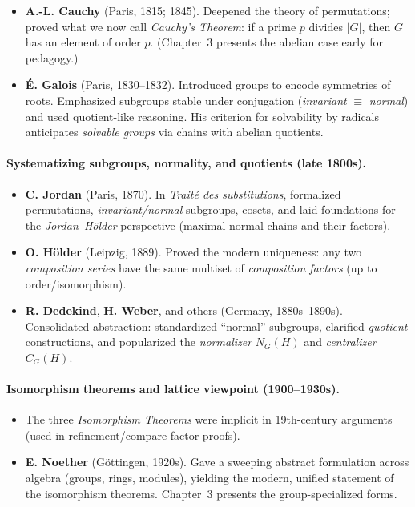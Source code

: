 \documentclass[9pt]{article}
\theoremstyle{definition}
\begin{document}
\begin{itemize}
  \item \textbf{A.-L. Cauchy} (Paris, 1815; 1845). Deepened the theory of permutations; proved what we now call \emph{Cauchy’s Theorem}: if a prime $p$ divides $|G|$, then $G$ has an element of order $p$. (Chapter~3 presents the abelian case early for pedagogy.)
  \item \textbf{É. Galois} (Paris, 1830–1832). Introduced groups to encode symmetries of roots. Emphasized subgroups stable under conjugation (\emph{invariant} $\equiv$ \emph{normal}) and used quotient-like reasoning. His criterion for solvability by radicals anticipates \emph{solvable groups} via chains with abelian quotients.
\end{itemize}

\newpage

\paragraph{Systematizing subgroups, normality, and quotients (late 1800s).}

\newpage

\begin{itemize}
  \item \textbf{C. Jordan} (Paris, 1870). In \emph{Traité des substitutions}, formalized permutations, \emph{invariant/normal} subgroups, cosets, and laid foundations for the \emph{Jordan–Hölder} perspective (maximal normal chains and their factors).
  \item \textbf{O. Hölder} (Leipzig, 1889). Proved the modern uniqueness: any two \emph{composition series} have the same multiset of \emph{composition factors} (up to order/isomorphism).
  \item \textbf{R. Dedekind}, \textbf{H. Weber}, and others (Germany, 1880s–1890s). Consolidated abstraction: standardized “normal” subgroups, clarified \emph{quotient} constructions, and popularized the \emph{normalizer} $N_G(H)$ and \emph{centralizer} $C_G(H)$.
\end{itemize}

\newpage

\paragraph{Isomorphism theorems and lattice viewpoint (1900–1930s).}

\newpage

\begin{itemize}
  \item The three \emph{Isomorphism Theorems} were implicit in 19th-century arguments (used in refinement/compare-factor proofs).
  \item \textbf{E. Noether} (Göttingen, 1920s). Gave a sweeping abstract formulation across algebra (groups, rings, modules), yielding the modern, unified statement of the isomorphism theorems. Chapter~3 presents the group-specialized forms.
\end{itemize}
\end{document}
